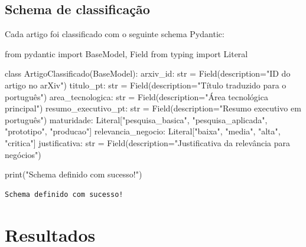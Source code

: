 \documentclass[
  brazilian,
  11pt,
  letterpaper,
  DIV=11,
  numbers=noendperiod]{scrartcl}
\newenvironment{Shaded}{}{}
\newcommand{\BuiltInTok}[1]{\textcolor[rgb]{0.84,0.23,0.29}{#1}}
\newcommand{\ImportTok}[1]{\textcolor[rgb]{0.01,0.18,0.38}{#1}}
\newcommand{\KeywordTok}[1]{\textcolor[rgb]{0.84,0.23,0.29}{#1}}
\newcommand{\NormalTok}[1]{\textcolor[rgb]{0.14,0.16,0.18}{#1}}
\newcommand{\OperatorTok}[1]{\textcolor[rgb]{0.14,0.16,0.18}{#1}}
\newcommand{\StringTok}[1]{\textcolor[rgb]{0.01,0.18,0.38}{#1}}
\begin{document}
\subsection{Schema de
classificação}\label{schema-de-classificauxe7uxe3o}

Cada artigo foi classificado com o seguinte schema Pydantic:

\begin{Shaded}
\begin{Highlighting}[]
\ImportTok{from}\NormalTok{ pydantic }\ImportTok{import}\NormalTok{ BaseModel, Field}
\ImportTok{from}\NormalTok{ typing }\ImportTok{import}\NormalTok{ Literal}

\KeywordTok{class}\NormalTok{ ArtigoClassificado(BaseModel):}
\NormalTok{    arxiv\_id: }\BuiltInTok{str} \OperatorTok{=}\NormalTok{ Field(description}\OperatorTok{=}\StringTok{"ID do artigo no arXiv"}\NormalTok{)}
\NormalTok{    titulo\_pt: }\BuiltInTok{str} \OperatorTok{=}\NormalTok{ Field(description}\OperatorTok{=}\StringTok{"Título traduzido para o português"}\NormalTok{)}
\NormalTok{    area\_tecnologica: }\BuiltInTok{str} \OperatorTok{=}\NormalTok{ Field(description}\OperatorTok{=}\StringTok{"Área tecnológica principal"}\NormalTok{)}
\NormalTok{    resumo\_executivo\_pt: }\BuiltInTok{str} \OperatorTok{=}\NormalTok{ Field(description}\OperatorTok{=}\StringTok{"Resumo executivo em português"}\NormalTok{)}
\NormalTok{    maturidade: Literal[}\StringTok{"pesquisa\_basica"}\NormalTok{, }\StringTok{"pesquisa\_aplicada"}\NormalTok{, }\StringTok{"prototipo"}\NormalTok{, }\StringTok{"producao"}\NormalTok{]}
\NormalTok{    relevancia\_negocio: Literal[}\StringTok{"baixa"}\NormalTok{, }\StringTok{"media"}\NormalTok{, }\StringTok{"alta"}\NormalTok{, }\StringTok{"critica"}\NormalTok{]}
\NormalTok{    justificativa: }\BuiltInTok{str} \OperatorTok{=}\NormalTok{ Field(description}\OperatorTok{=}\StringTok{"Justificativa da relevância para negócios"}\NormalTok{)}

\BuiltInTok{print}\NormalTok{(}\StringTok{"Schema definido com sucesso!"}\NormalTok{)}
\end{Highlighting}
\end{Shaded}

\begin{verbatim}
Schema definido com sucesso!
\end{verbatim}

\section{Resultados}\label{resultados}
\end{document}
